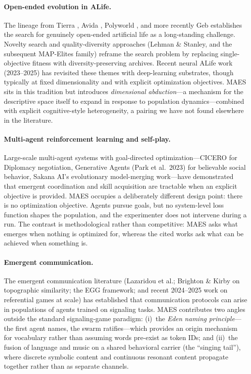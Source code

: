 \documentclass[11pt,a4paper]{article}
\begin{document}
\paragraph{Open-ended evolution in ALife.}
The lineage from Tierra \cite{ray1991tierra}, Avida \cite{ofria2004avida},
Polyworld \cite{yaeger1994polyworld}, and more recently Geb
\cite{channon2003geb} establishes the search for genuinely open-ended
artificial life as a long-standing challenge. Novelty search and
quality-diversity approaches (Lehman \& Stanley, and the subsequent
MAP-Elites family) reframe the search problem by replacing single-objective
fitness with diversity-preserving archives. Recent neural ALife work
(2023--2025) has revisited these themes with deep-learning substrates,
though typically at fixed dimensionality and with explicit optimization
objectives. MAES sits in this tradition but introduces \emph{dimensional
abduction}---a mechanism for the descriptive space itself to expand in
response to population dynamics---combined with explicit cognitive-style
heterogeneity, a pairing we have not found elsewhere in the literature.

\paragraph{Multi-agent reinforcement learning and self-play.}
Large-scale multi-agent systems with goal-directed optimization---CICERO
for Diplomacy negotiation, Generative Agents (Park et al.~2023) for
believable social behavior, Sakana AI's evolutionary model-merging
work---have demonstrated that emergent coordination and skill acquisition
are tractable when an explicit objective is provided. MAES occupies a
deliberately different design point: there is no optimization objective.
Agents pursue goals, but no system-level loss function shapes the
population, and the experimenter does not intervene during a run. The
contrast is methodological rather than competitive: MAES asks what
emerges when nothing is optimized for, whereas the cited works ask what
can be achieved when something is.

\paragraph{Emergent communication.}
The emergent communication literature (Lazaridou et al.; Brighton \& Kirby
on topographic similarity; the EGG framework; and recent 2024--2025 work
on referential games at scale) has established that communication
protocols can arise in populations of agents trained on signaling tasks.
MAES contributes two angles outside the standard signaling-game paradigm:
(i)~the \emph{Eden naming principle}---the first agent names, the swarm
ratifies---which provides an origin mechanism for vocabulary rather than
assuming words pre-exist as token IDs; and (ii)~the fusion of language
and music on a shared behavioral carrier (the ``singing tail''), where
discrete symbolic content and continuous resonant content propagate
together rather than as separate channels.
\end{document}
